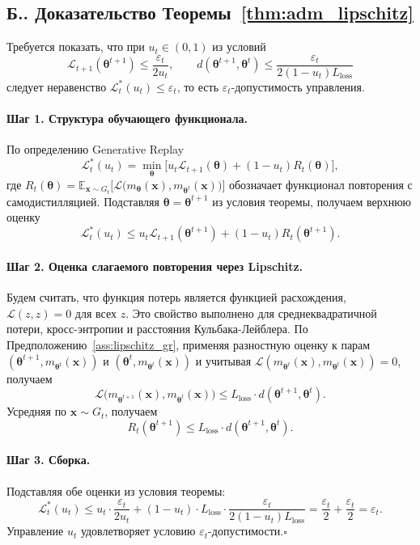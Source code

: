 \documentclass[a4paper,14pt,oneside,openany]{extarticle}
\newcommand{\bx}{\mathbf{x}}
\newcommand{\cL}{\mathcal{L}}
\newcommand{\bbE}{\mathbb{E}}
\newcommand{\btheta}{\boldsymbol{\theta}}
\begin{document}
\setcounter{appthm}{0}
\renewcommand{\theappthm}{Б.}

\subsection*{\theappthm. Доказательство Теоремы~\ref{thm:adm_lipschitz}}\label{app:proof_adm_lipschitz}

Требуется показать, что при $u_t \in (0, 1)$ из условий
\[
    \cL_{t+1}(\btheta^{t+1}) \le \frac{\varepsilon_t}{2 u_t}, \qquad d(\btheta^{t+1}, \btheta^t) \le \frac{\varepsilon_t}{2(1 - u_t) L_{\text{loss}}}
\]
следует неравенство $\cL^*_t(u_t) \le \varepsilon_t$, то есть $\varepsilon_t$-допустимость управления.

\paragraph{Шаг 1. Структура обучающего функционала.} По определению Generative Replay
\[
    \cL^*_t(u_t) = \min_{\btheta} \bigl[u_t \cL_{t+1}(\btheta) + (1 - u_t) R_t(\btheta)\bigr],
\]
где $R_t(\btheta) = \bbE_{\bx \sim G_t}\bigl[\cL\bigl(m_{\btheta}(\bx), m_{\btheta^t}(\bx)\bigr)\bigr]$ обозначает функционал повторения с самодистилляцией. Подставляя $\btheta = \btheta^{t+1}$ из условия теоремы, получаем верхнюю оценку
\[
    \cL^*_t(u_t) \le u_t \cL_{t+1}(\btheta^{t+1}) + (1 - u_t) R_t(\btheta^{t+1}).
\]

\paragraph{Шаг 2. Оценка слагаемого повторения через Lipschitz.} Будем считать, что функция потерь является функцией расхождения, $\cL(z, z) = 0$ для всех $z$. Это свойство выполнено для среднеквадратичной потери, кросс-энтропии и расстояния Кульбака-Лейблера. По Предположению~\ref{ass:lipschitz_gr}, применяя разностную оценку к парам $(\btheta^{t+1}, m_{\btheta^t}(\bx))$ и $(\btheta^t, m_{\btheta^t}(\bx))$ и учитывая $\cL(m_{\btheta^t}(\bx), m_{\btheta^t}(\bx)) = 0$, получаем
\[
    \cL\bigl(m_{\btheta^{t+1}}(\bx), m_{\btheta^t}(\bx)\bigr) \le L_{\text{loss}}\cdot d(\btheta^{t+1}, \btheta^t).
\]
Усредняя по $\bx \sim G_t$, получаем
\[
    R_t(\btheta^{t+1}) \le L_{\text{loss}}\cdot d(\btheta^{t+1}, \btheta^t).
\]

\paragraph{Шаг 3. Сборка.} Подставляя обе оценки из условия теоремы:
\[
    \cL^*_t(u_t) \le u_t \cdot \frac{\varepsilon_t}{2 u_t} + (1 - u_t) \cdot L_{\text{loss}} \cdot \frac{\varepsilon_t}{2(1 - u_t) L_{\text{loss}}} = \frac{\varepsilon_t}{2} + \frac{\varepsilon_t}{2} = \varepsilon_t.
\]
Управление $u_t$ удовлетворяет условию $\varepsilon_t$-допустимости.\hfill$\square$
\end{document}
